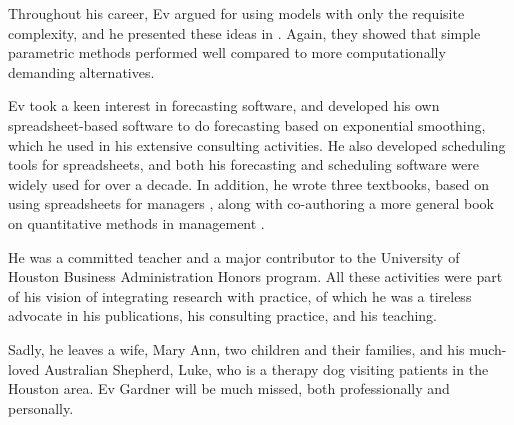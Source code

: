 \documentclass[11pt, a4paper]{article}
\begin{document}
Throughout his career, Ev argued for using models with only the requisite complexity, and he presented these ideas in \citet{Syntetos2015ForecastingII}. Again, they showed that simple parametric methods performed well compared to more computationally demanding alternatives.

Ev took a keen interest in forecasting software, and developed his own spreadsheet-based software to do forecasting based on exponential smoothing, which he used in his extensive consulting activities. He also developed scheduling tools for spreadsheets, and both his forecasting and scheduling software were widely used for over a decade. In addition, he wrote three textbooks, based on using spreadsheets for managers \citep{book92,book93,book94}, along with co-authoring a more general book on quantitative methods in management \citep{book95}.

He was a committed teacher and a major contributor to the University of Houston Business Administration Honors program. All these activities were part of his vision of integrating research with practice, of which he was a tireless advocate in his publications, his consulting practice, and his teaching.

Sadly, he leaves a wife, Mary Ann, two children and their families, and his much-loved Australian Shepherd, Luke, who is a therapy dog visiting patients in the Houston area. Ev Gardner will be much missed, both professionally and personally.


\printbibliography

\end{document}
